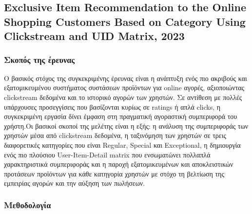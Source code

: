 \documentclass[12pt,a4paper]{article}
\begin{document}
	\subsection{Exclusive Item Recommendation to the Online Shopping Customers Based on Category Using Clickstream and UID Matrix, 2023}
	\subsubsection{Σκοπός της έρευνας}
     Ο βασικός στόχος της συγκεκριμένης έρευνας \cite{EIR} είναι η ανάπτυξη ενός πιο ακριβούς και εξατομικευμένου συστήματος συστάσεων προϊόντων για online αγορές, αξιοποιώντας clickstream δεδομένα και το ιστορικό αγορών των χρηστών. Σε αντίθεση με πολλές υπάρχουσες προσεγγίσεις που βασίζονται κυρίως σε ratings ή απλά clicks, η συγκεκριμένη εργασία δίνει έμφαση στη πραγματική αγοραστική συμπεριφορά του χρήστη.Οι βασικοί σκοποί της μελέτης είναι η εξής: η ανάλυση της συμπεριφοράς των χρηστών μέσα από clickstream δεδομένα, η ταξινόμηση των χρηστών σε τρεις διαφορετικές κατηγορίες που είναι Regular, Special και Exceptional, η δημιουργία ενός πιο πλούσιου User-Item-Detail matrix που ενσωματώνει πολλαπλά χαρακτηριστικά συμπεριφοράς και η παροχή εξατομικευμένων και αποκλειστικών προτάσεων προϊόντων για κάθε κατηγορία χρηστών με στόχο τη βελτίωση της εμπειρίας αγορών και την αύξηση των πωλήσεων.
	\subsubsection{Μεθοδολογία}
	
\end{document}
